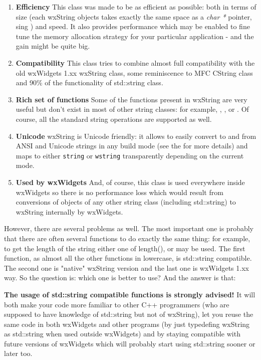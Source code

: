 \begin{enumerate}\itemsep=0pt
\item {\bf Efficiency} This class was made to be as efficient as possible: both
in terms of size (each wxString objects takes exactly the same space as a {\it
char *} pointer, sing ) and speed.
It also provides performance  
which may be enabled to fine tune the memory allocation strategy for your
particular application - and the gain might be quite big.
\item {\bf Compatibility} This class tries to combine almost full compatibility
with the old wxWidgets 1.xx wxString class, some reminiscence to MFC CString
class and 90\% of the functionality of std::string class.
\item {\bf Rich set of functions} Some of the functions present in wxString are
very useful but don't exist in most of other string classes: for example, 
, 
,  
or . Of course, all the standard string
operations are supported as well.
\item {\bf Unicode} wxString is Unicode friendly: it allows to easily convert
to and from ANSI and Unicode strings in any build mode (see the 
 for more details) and maps to either
{\tt string} or {\tt wstring} transparently depending on the current mode.
\item {\bf Used by wxWidgets} And, of course, this class is used everywhere
inside wxWidgets so there is no performance loss which would result from
conversions of objects of any other string class (including std::string) to
wxString internally by wxWidgets.
\end{enumerate}

However, there are several problems as well. The most important one is probably
that there are often several functions to do exactly the same thing: for
example, to get the length of the string either one of 
length(),  or 
 may be used. The first function, as almost
all the other functions in lowercase, is std::string compatible. The second one
is "native" wxString version and the last one is wxWidgets 1.xx way. So the
question is: which one is better to use? And the answer is that:

{\bf The usage of std::string compatible functions is strongly advised!} It will
both make your code more familiar to other C++ programmers (who are supposed to
have knowledge of std::string but not of wxString), let you reuse the same code
in both wxWidgets and other programs (by just typedefing wxString as std::string
when used outside wxWidgets) and by staying compatible with future versions of
wxWidgets which will probably start using std::string sooner or later too.

